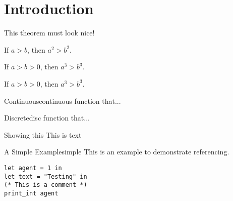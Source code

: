 \newpage
\chapter{Introduction}
\label{Introduction}

\begin{theorem}
	This theorem must look nice!
\end{theorem}
\begin{theorem}
If \(a > b\), then \(a^2 > b^2\).
\end{theorem}

\begin{corollary}
If \(a > b > 0\), then \(a^3 > b^3\).
\end{corollary}

\begin{proposition}
If \(a > b > 0\), then \(a^3 > b^3\).
\end{proposition}

\begin{definition}{Continuous}{continuous}
	{function that...}
\end{definition}

\begin{definition}{Discrete}{disc}
	{function that...}
\end{definition}


\begin{example}{Showing this}{}
	This is text
\end{example}


\begin{example}{A Simple Example}{simple}
This is an example to demonstrate referencing.
	\hfill
\end{example}

\begin{lstlisting}[language=caml]
let agent = 1 in
let text = "Testing" in
(* This is a comment *)
print_int agent
\end{lstlisting}

